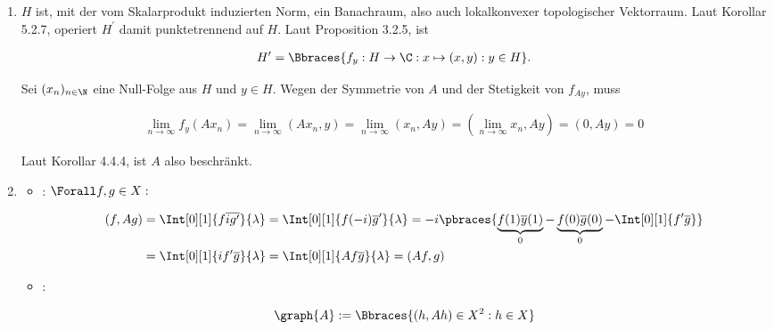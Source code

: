 \begin{solution}

\phantom{}

\begin{enumerate}

  \item
  $H$ ist, mit der vom Skalarprodukt induzierten Norm, ein Banachraum, also auch lokalkonvexer topologischer Vektorraum.
  Laut Korollar 5.2.7, operiert $H^\prime$ damit punktetrennend auf $H$.
  Laut Proposition 3.2.5, ist

  \begin{align*}
    H^\prime
    =
    \Bbraces
    {
      f_y:
      H \to \C:
      x \mapsto (x, y):
      y \in H
    }.
  \end{align*}

  Sei $(x_n)_{n \in \N}$ eine Null-Folge aus $H$ und $y \in H$.
  Wegen der Symmetrie von $A$ und der Stetigkeit von $f_{A y}$, muss

  \begin{align*}
    \lim_{n \to \infty} f_y(A x_n)
    =
    \lim_{n \to \infty} (A x_n, y)
    =
    \lim_{n \to \infty} (x_n, A y)
    =
    (\lim_{n \to \infty} x_n, A y)
    =
    (0, A y) = 0
  \end{align*}

  Laut Korollar 4.4.4, ist $A$ also beschränkt.

  \item
  \begin{itemize}

    \item
    :
    $\Forall f, g \in X:$

    \begin{align*}
      (f, A g)
      & =
      \Int[0][1]{f \overline{i g^\prime}}{\lambda}
      =
      \Int[0][1]{f (-i) \overline{g}^\prime}{\lambda}
      =
      -i \pbraces
      {
        \underbrace{f(1) \overline{y}(1)}_0 -
        \underbrace{f(0) \overline{g}(0)}_0 -
        \Int[0][1]{f^\prime \overline{g}}
      } \\
      & =
      \Int[0][1]{i f^\prime \overline{g}}{\lambda}
      =
      \Int[0][1]{A f \overline{g}}{\lambda}
      =
      (A f, g)
    \end{align*}

    \item
    :

    \begin{align*}
      \graph{A} :=
      \Bbraces
      {
        (h, A h) \in X^2:
        h \in X
      }
    \end{align*}


\end{itemize}
\end{enumerate}
\end{solution}
